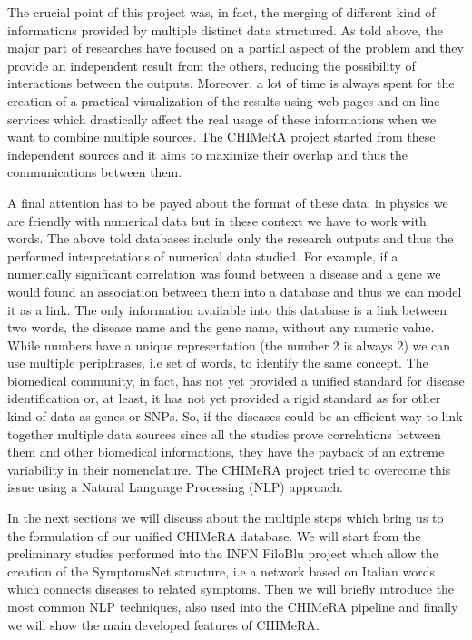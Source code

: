 \documentclass{standalone}
\begin{document}
The crucial point of this project was, in fact, the merging of different kind of informations provided by multiple distinct data structured.
As told above, the major part of researches have focused on a partial aspect of the problem and they provide an independent result from the others, reducing the possibility of interactions between the outputs.
Moreover, a lot of time is always spent for the creation of a practical visualization of the results using web pages and on-line services which drastically affect the real usage of these informations when we want to combine multiple sources.
The \textsf{CHIMeRA} project started from these independent sources and it aims to maximize their overlap and thus the communications between them.

A final attention has to be payed about the format of these data: in physics we are friendly with numerical data but in these context we have to work with words.
The above told databases include only the research outputs and thus the performed interpretations of numerical data studied.
For example, if a numerically significant correlation was found between a disease and a gene we would found an association between them into a database and thus we can model it as a link.
The only information available into this database is a link between two words, the disease name and the gene name, without any numeric value.
While numbers have a unique representation (the number 2 is always 2) we can use multiple periphrases, i.e set of words, to identify the same concept.
The biomedical community, in fact, has not yet provided a unified standard for disease identification or, at least, it has not yet provided a rigid standard as for other kind of data as genes or SNPs.
So, if the diseases could be an efficient way to link together multiple data sources since all the studies prove correlations between them and other biomedical informations, they have the payback of an extreme variability in their nomenclature.
The \textsf{CHIMeRA} project tried to overcome this issue using a Natural Language Processing (NLP) approach.

In the next sections we will discuss about the multiple steps which bring us to the formulation of our unified \textsf{CHIMeRA} database.
We will start from the preliminary studies performed into the INFN FiloBlu project which allow the creation of the \textsf{SymptomsNet} structure, i.e a  network based on Italian words which connects diseases to related symptoms.
Then we will briefly introduce the most common NLP techniques, also used into the \textsf{CHIMeRA} pipeline and finally we will show the main developed features of \textsf{CHIMeRA}.

\end{document}
